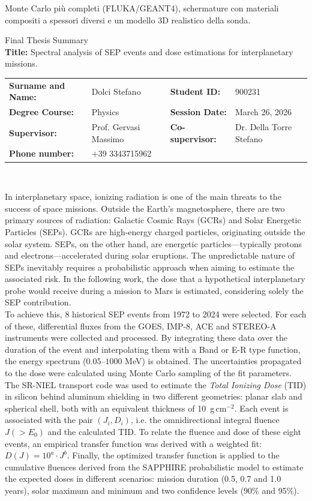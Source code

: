 \documentclass[a4paper,12pt]{article}
\begin{document}
Monte Carlo più completi (FLUKA/GEANT4), schermature con materiali compositi a spessori diversi e un modello 3D realistico della sonda.
\clearpage


\begin{center}
{\LARGE Final Thesis Summary}\\[0.3cm]
\small
\textbf{Title:} Spectral analysis of SEP events and dose estimations for interplanetary missions.\\[8pt]
\begin{tabular}{ll@{\qquad}ll}
\textbf{Surname and Name:} & Dolci Stefano & \textbf{Student ID:} & 900231 \\
\textbf{Degree Course:} & Physics & \textbf{Session Date:} & March 26, 2026 \\
\textbf{Supervisor:} & Prof. Gervasi Massimo & \textbf{Co-supervisor:} & Dr. Della Torre Stefano \\
\textbf{Phone number:} & +39 3343715962 & & \\
\end{tabular}\\[0.2cm]
\end{center}
\vspace{0.2cm}
\noindent In interplanetary space, ionizing radiation is one of the main threats to the success of space missions. Outside the Earth's magnetosphere, there are two primary sources of radiation: Galactic Cosmic Rays (GCRs) and Solar Energetic Particles (SEPs). GCRs are high-energy charged particles, originating outside the solar system. SEPs, on the other hand, are energetic particles—typically protons and electrons—accelerated during solar eruptions. The unpredictable nature of SEPs inevitably requires a probabilistic approach when aiming to estimate the associated risk. In the following work, the dose that a hypothetical interplanetary probe would receive during a mission to Mars is estimated, considering solely the SEP contribution.\\
To achieve this, 8 historical SEP events from 1972 to 2024 were selected. For each of these, differential fluxes from the GOES, IMP-8, ACE and STEREO-A instruments were collected and processed. By integrating these data over the duration of the event and interpolating them with a Band or E-R type function, the energy spectrum ($0.05$--$1000$ MeV) is obtained. The uncertainties propagated to the dose were calculated using Monte Carlo sampling of the fit parameters. The SR-NIEL transport code was used to estimate the \textit{Total Ionizing Dose} (TID) in silicon behind aluminum shielding in two different geometries: planar slab and spherical shell, both with an equivalent thickness of 10~g\,cm$^{-2}$. Each event is associated with the pair $(J_i, D_i)$, i.e. the omnidirectional integral fluence $J(>E_0)$ and the calculated TID. To relate the fluence and dose of these eight events, an empirical transfer function was derived with a weighted fit: $ D(J) = 10^{a} \cdot J^{b}$. Finally, the optimized transfer function is applied to the cumulative fluences derived from the SAPPHIRE probabilistic model to estimate the expected doses in different scenarios: mission duration (0.5, 0.7 and 1.0 years), solar maximum and minimum and two confidence levels (90\% and 95\%).\\
\end{document}
